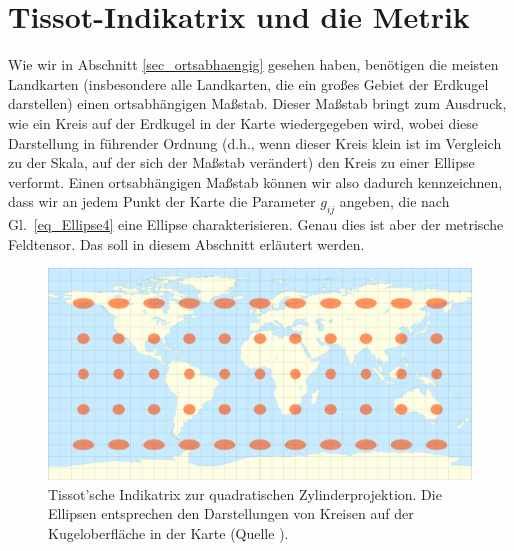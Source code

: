 \section{Tissot-Indikatrix und die Metrik} 
\label{sec_Tissot}

Wie wir in Abschnitt \ref{sec_ortsabhaengig} gesehen haben, ben\"otigen die meisten
Landkarten (insbesondere alle Landkarten, die ein gro\ss es Gebiet der Erdkugel darstellen)
einen ortsabh\"angigen Ma\ss stab. Dieser Ma\ss stab bringt zum Ausdruck, wie
ein Kreis auf der Erdkugel in der Karte wiedergegeben wird, wobei diese Darstellung
in f\"uhrender Ordnung (d.h., wenn dieser Kreis klein ist im Vergleich zu der Skala, auf
der sich der Ma\ss stab ver\"andert) den Kreis zu einer Ellipse verformt. Einen ortsabh\"angigen   
Ma\ss stab k\"onnen wir also dadurch kennzeichnen, dass wir an jedem Punkt der Karte die
Parameter $g_{ij}$ angeben, die nach Gl.\ \ref{eq_Ellipse4} eine Ellipse charakterisieren. Genau
dies ist aber der metrische Feldtensor. Das soll in diesem Abschnitt erl\"autert werden. 

\begin{figure}[htb]
\includegraphics[width=\textwidth]{./Bilder/Tissot_rectangle.png}
\caption{\label{fig_Tissot1}%
Tissot'sche Indikatrix zur quadratischen Zylinderprojektion. Die Ellipsen entsprechen den
Darstellungen von Kreisen auf der Kugeloberfl\"ache in der Karte (Quelle \cite{WikiTissot}).}
\end{figure}


